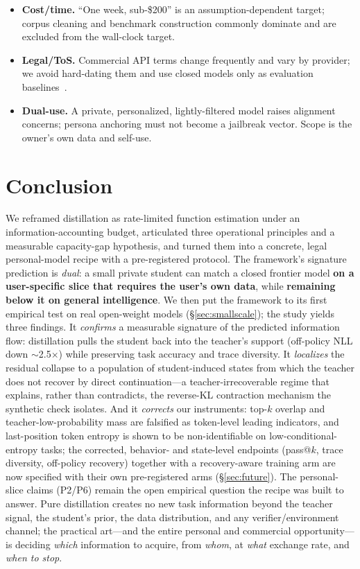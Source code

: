 \documentclass[11pt]{article}
\begin{document}
\begin{itemize}
  \item \textbf{Cost/time.} ``One week, sub-\$200'' is an assumption-dependent target; corpus cleaning and benchmark construction commonly dominate and are excluded from the wall-clock target.
  \item \textbf{Legal/ToS.} Commercial API terms change frequently and vary by provider; we avoid hard-dating them and use closed models only as evaluation baselines~\cite{tos}.
  \item \textbf{Dual-use.} A private, personalized, lightly-filtered model raises alignment concerns; persona anchoring must not become a jailbreak vector. Scope is the owner's own data and self-use.
\end{itemize}

\section{Conclusion}
We reframed distillation as rate-limited function estimation under an information-accounting budget, articulated three operational principles and a measurable capacity-gap hypothesis, and turned them into a concrete, legal personal-model recipe with a pre-registered protocol. The framework's signature prediction is \emph{dual}: a small private student can match a closed frontier model \textbf{on a user-specific slice that requires the user's own data}, while \textbf{remaining below it on general intelligence}. We then put the framework to its first empirical test on real open-weight models (\S\ref{sec:smallscale}); the study yields three findings. It \emph{confirms} a measurable signature of the predicted information flow: distillation pulls the student back into the teacher's support (off-policy NLL down $\sim$2.5$\times$) while preserving task accuracy and trace diversity. It \emph{localizes} the residual collapse to a population of student-induced states from which the teacher does not recover by direct continuation---a teacher-irrecoverable regime that explains, rather than contradicts, the reverse-KL contraction mechanism the synthetic check isolates. And it \emph{corrects} our instruments: top-$k$ overlap and teacher-low-probability mass are falsified as token-level leading indicators, and last-position token entropy is shown to be non-identifiable on low-conditional-entropy tasks; the corrected, behavior- and state-level endpoints (pass@$k$, trace diversity, off-policy recovery) together with a recovery-aware training arm are now specified with their own pre-registered arms (\S\ref{sec:future}). The personal-slice claims (P2/P6) remain the open empirical question the recipe was built to answer. Pure distillation creates no new task information beyond the teacher signal, the student's prior, the data distribution, and any verifier/environment channel; the practical art---and the entire personal and commercial opportunity---is deciding \emph{which} information to acquire, from \emph{whom}, at \emph{what} exchange rate, and \emph{when to stop}.
\end{document}
